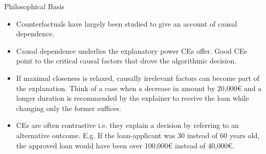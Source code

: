 \documentclass[11pt,compress,t,notes=noshow, xcolor=table]{beamer}
\begin{document}
\begin{vbframe}{Philosophical Basis}
	\begin{itemize}
	\item Counterfactuals have largely been studied to give an account of causal dependence.
		\item Causal dependence underlies the explanatory power CEs offer. Good CEs point to the critical causal factors that drove the algorithmic decision.
		\item If maximal closeness is relaxed, causally irrelevant factors can become part of the explanation. Think of a case when a decrease in amount by 20,000€ and a longer duration is recommended by the explainer to receive the loan while changing only the former suffices.
		\item CEs are often contrastive i.e. they explain a decision by referring to an alternative outcome. E.g. If the loan-applicant was 30 instead of 60 years old, the approved loan would have been over 100,000€ instead of 40,000€.%
	\end{itemize}
\end{vbframe}

\end{document}

